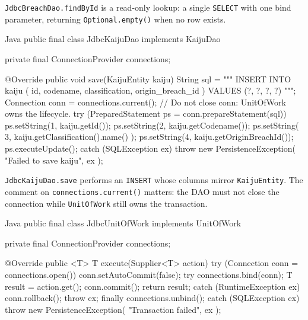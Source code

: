 \texttt{JdbcBreachDao.findById} is a read-only lookup: a single \texttt{SELECT} with one bind parameter, returning \texttt{Optional.empty()} when no row exists.

\begin{ridercode}{Java}
public final class JdbcKaijuDao implements KaijuDao
{
    private final ConnectionProvider connections;

    @Override
    public void save(KaijuEntity kaiju)
    {
        String sql = """
            INSERT INTO kaiju (
                id, codename, classification, origin_breach_id
            )
            VALUES (?, ?, ?, ?)
            """;
        Connection conn = connections.current();
        // Do not close conn: UnitOfWork owns the lifecycle.
        try (PreparedStatement ps = conn.prepareStatement(sql))
        {
            ps.setString(1, kaiju.getId());
            ps.setString(2, kaiju.getCodename());
            ps.setString(
                3,
                kaiju.getClassification().name()
            );
            ps.setString(4, kaiju.getOriginBreachId());
            ps.executeUpdate();
        }
        catch (SQLException ex)
        {
            throw new PersistenceException(
                "Failed to save kaiju",
                ex
            );
        }
    }
}
\end{ridercode}
\label{lst:three-layered-jdbc-kaiju-dao-save}

\texttt{JdbcKaijuDao.save} performs an \texttt{INSERT} whose columns mirror \texttt{KaijuEntity}. The comment on \texttt{connections.current()} matters: the DAO must not close the connection while \texttt{UnitOfWork} still owns the transaction.

\begin{ridercode}{Java}
public final class JdbcUnitOfWork implements UnitOfWork
{
    private final ConnectionProvider connections;

    @Override
    public <T> T execute(Supplier<T> action)
    {
        try (Connection conn = connections.open())
        {
            conn.setAutoCommit(false);
            try
            {
                connections.bind(conn);
                T result = action.get();
                conn.commit();
                return result;
            }
            catch (RuntimeException ex)
            {
                conn.rollback();
                throw ex;
            }
            finally
            {
                connections.unbind();
            }
        }
        catch (SQLException ex)
        {
            throw new PersistenceException(
                "Transaction failed",
                ex
            );
        }
    }
}
\end{ridercode}
\label{lst:three-layered-jdbc-unit-of-work}

